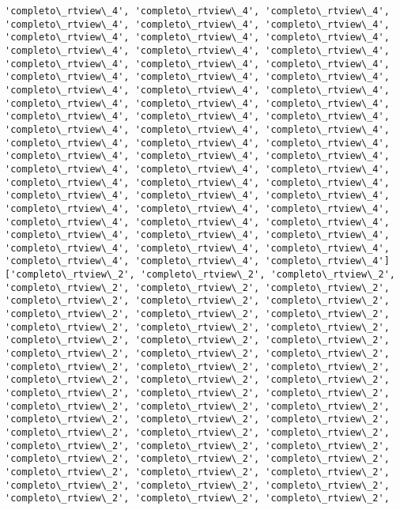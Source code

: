 \documentclass[11pt]{article}
\begin{document}
\begin{Verbatim}[commandchars=\\\{\}]
'completo\_rtview\_4', 'completo\_rtview\_4', 'completo\_rtview\_4',
'completo\_rtview\_4', 'completo\_rtview\_4', 'completo\_rtview\_4',
'completo\_rtview\_4', 'completo\_rtview\_4', 'completo\_rtview\_4',
'completo\_rtview\_4', 'completo\_rtview\_4', 'completo\_rtview\_4',
'completo\_rtview\_4', 'completo\_rtview\_4', 'completo\_rtview\_4',
'completo\_rtview\_4', 'completo\_rtview\_4', 'completo\_rtview\_4',
'completo\_rtview\_4', 'completo\_rtview\_4', 'completo\_rtview\_4',
'completo\_rtview\_4', 'completo\_rtview\_4', 'completo\_rtview\_4',
'completo\_rtview\_4', 'completo\_rtview\_4', 'completo\_rtview\_4',
'completo\_rtview\_4', 'completo\_rtview\_4', 'completo\_rtview\_4',
'completo\_rtview\_4', 'completo\_rtview\_4', 'completo\_rtview\_4',
'completo\_rtview\_4', 'completo\_rtview\_4', 'completo\_rtview\_4',
'completo\_rtview\_4', 'completo\_rtview\_4', 'completo\_rtview\_4',
'completo\_rtview\_4', 'completo\_rtview\_4', 'completo\_rtview\_4',
'completo\_rtview\_4', 'completo\_rtview\_4', 'completo\_rtview\_4',
'completo\_rtview\_4', 'completo\_rtview\_4', 'completo\_rtview\_4',
'completo\_rtview\_4', 'completo\_rtview\_4', 'completo\_rtview\_4',
'completo\_rtview\_4', 'completo\_rtview\_4', 'completo\_rtview\_4',
'completo\_rtview\_4', 'completo\_rtview\_4', 'completo\_rtview\_4',
'completo\_rtview\_4', 'completo\_rtview\_4', 'completo\_rtview\_4']
['completo\_rtview\_2', 'completo\_rtview\_2', 'completo\_rtview\_2',
'completo\_rtview\_2', 'completo\_rtview\_2', 'completo\_rtview\_2',
'completo\_rtview\_2', 'completo\_rtview\_2', 'completo\_rtview\_2',
'completo\_rtview\_2', 'completo\_rtview\_2', 'completo\_rtview\_2',
'completo\_rtview\_2', 'completo\_rtview\_2', 'completo\_rtview\_2',
'completo\_rtview\_2', 'completo\_rtview\_2', 'completo\_rtview\_2',
'completo\_rtview\_2', 'completo\_rtview\_2', 'completo\_rtview\_2',
'completo\_rtview\_2', 'completo\_rtview\_2', 'completo\_rtview\_2',
'completo\_rtview\_2', 'completo\_rtview\_2', 'completo\_rtview\_2',
'completo\_rtview\_2', 'completo\_rtview\_2', 'completo\_rtview\_2',
'completo\_rtview\_2', 'completo\_rtview\_2', 'completo\_rtview\_2',
'completo\_rtview\_2', 'completo\_rtview\_2', 'completo\_rtview\_2',
'completo\_rtview\_2', 'completo\_rtview\_2', 'completo\_rtview\_2',
'completo\_rtview\_2', 'completo\_rtview\_2', 'completo\_rtview\_2',
'completo\_rtview\_2', 'completo\_rtview\_2', 'completo\_rtview\_2',
'completo\_rtview\_2', 'completo\_rtview\_2', 'completo\_rtview\_2',
'completo\_rtview\_2', 'completo\_rtview\_2', 'completo\_rtview\_2',
'completo\_rtview\_2', 'completo\_rtview\_2', 'completo\_rtview\_2',

\end{Verbatim}
\end{document}
